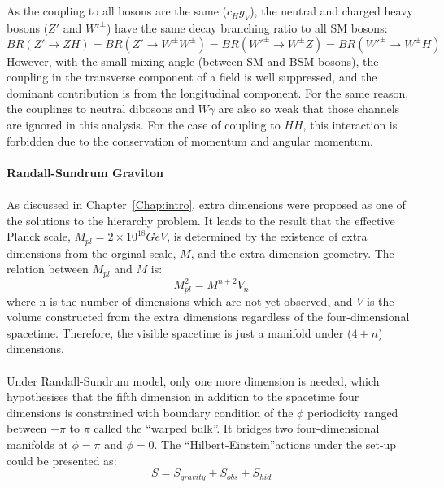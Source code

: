 \\
\\As the coupling to all bosons are the same ($c_{H}g_{V}$), the neutral and charged heavy bosons ($Z'$ and $W'^{\pm}$) have the same decay branching ratio to all SM bosons:
\begin{equation}
BR(Z'\rightarrow ZH) = BR(Z'\rightarrow W^\pm W^\pm) = BR(W'^\pm \rightarrow W^\pm Z) = BR(W'^\pm \rightarrow W^\pm H)
\end{equation}
However, with the small mixing angle (between SM and BSM bosons), the coupling in the transverse component of a field is well suppressed, and the dominant contribution is from the longitudinal component. For the same reason, the couplings to neutral dibosons and $W\gamma$ are also so weak that those channels are ignored in this analysis. For the case of coupling to $HH$, this interaction is forbidden due to the conservation of momentum and angular momentum. 
\\
\\{\bf Randall-Sundrum Graviton}
\\
\\As discussed in Chapter~\ref{Chap:intro}, extra dimensions were proposed as one of the solutions\cite{Randall:1999ee} to the hierarchy problem. It leads to the result that the effective Planck scale, $M_{pl}=2\times10^{18}GeV$, is determined by the existence of extra dimensions from the orginal scale, $M$, and the extra-dimension geometry. The relation between $M_{pl}$ and $M$ is: 
\begin{equation}
\label{Eq:planck_relation}
M_{pl}^{2} = M^{n+2}V_{n}
\end{equation}
where n is the number of dimensions which are not yet observed, and $V$ is the volume constructed from the extra dimensions regardless of the four-dimensional spacetime. Therefore, the visible spacetime is just a manifold under ($4+n$) dimensions.
\\ 
\\Under Randall-Sundrum model, only one more dimension is needed, which hypothesises that the fifth dimension in addition to the spacetime four dimensions is constrained with boundary condition of the $\phi$ periodicity ranged between $-\pi$ to $\pi$ called the ``warped bulk''. It bridges two four-dimensional manifolds at $\phi=\pi$  and $\phi=0$. The ``Hilbert-Einstein''actions under the set-up could be presented as:
\begin{equation}
S = S_{gravity} +S_{obs} + S_{hid}
\end{equation}
